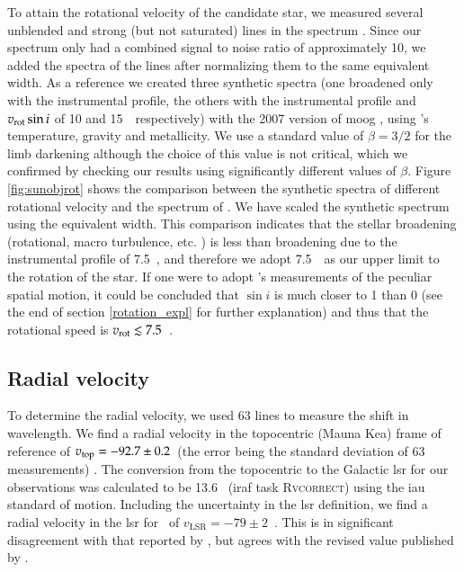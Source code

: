 To attain the rotational velocity of the candidate star, we measured
several unblended and strong (but not saturated)  lines in the
spectrum \citep{1974lafl.book.....W}. Since our spectrum only had a
combined signal to noise ratio of approximately 10, we added the
spectra of the lines after normalizing them to the same equivalent
width. As a reference we created three synthetic spectra (one broadened only with the instrumental profile, the others with the instrumental profile and $v_{\rm{rot}}\sin{i}$ of 10 and 15~\kms\ respectively) with the 2007 version of \gls{moog} \citep{1973ApJ...184..839S}, using \gh's temperature, gravity and metallicity.  We use a standard value of $\beta=3/2$ for the limb darkening although the choice
of this value is not critical, which we confirmed by checking our
results using significantly different values of $\beta$. Figure
\ref{fig:sunobjrot} shows the comparison between the synthetic spectra of different rotational velocity and the spectrum of \starg. We have scaled the synthetic spectrum using the equivalent width. This comparison indicates that the stellar broadening (rotational, macro turbulence, etc. ) is less than broadening due to the instrumental profile of 7.5~\kms, and therefore we adopt 7.5~\kms\ as our upper limit to the rotation of the star. If one were to adopt \rl's measurements of the
peculiar spatial motion, it could be concluded that $\sin{i}$ is much closer
to 1 than 0 (see the end of section \ref{rotation_expl} for further
explanation) and thus that the rotational speed is $v_{\rm rot} \lesssim 7.5$~\kms.


\subsection{Radial velocity}

To determine the radial velocity, we used 63 lines to measure the shift
in wavelength. We find a radial velocity in the topocentric (Mauna
Kea) frame of reference of $v_{\rm top} = - 92.7 \pm 0.2$~\kms (the
error being the standard deviation of 63 measurements) . The
conversion from the topocentric to the Galactic \gls{lsr} for our
observations was calculated to be 13.6 \kms\ (\gls{iraf} task \textsc{Rvcorrect})
using the \gls{iau} standard of motion. Including the uncertainty in the \gls{lsr}
definition, we find a radial velocity in the \gls{lsr} for \starg\ of
$v_\textrm{LSR} = -79 \pm 2$~\kms. This is in significant disagreement
with that reported by \rl, but agrees with the revised value published by \gh.


